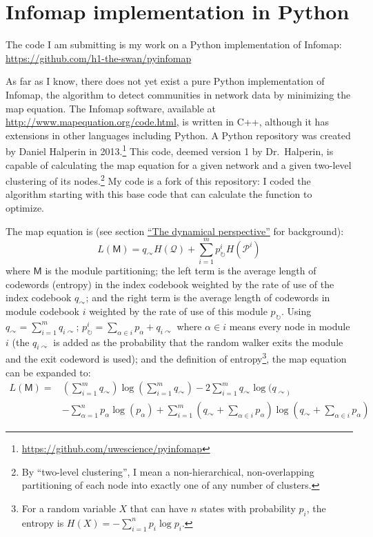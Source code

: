 \hypertarget{pyinfomap}{\section{Infomap implementation in
Python}\label{pyinfomap}}

\protect\hyperlink{pyinfomap}{}

The code I am submitting is my work on a Python implementation of
Infomap: \url{https://github.com/h1-the-swan/pyinfomap}

As far as I know, there does not yet exist a pure Python implementation
of Infomap, the algorithm to detect communities in network data by
minimizing the map equation. The Infomap software, available at
\url{http://www.mapequation.org/code.html}, is written in C++, although
it has extensions in other languages including Python. A Python
repository was created by Daniel Halperin in 2013.\footnote{\url{https://github.com/uwescience/pyinfomap}}
This code, deemed version 1 by Dr.~Halperin, is capable of calculating
the map equation for a given network and a given two-level clustering of
its nodes.\footnote{By ``two-level clustering'', I mean a
  non-hierarchical, non-overlapping partitioning of each node into
  exactly one of any number of clusters.} My code is a fork of this
repository: I coded the algorithm starting with this base code that can
calculate the function to optimize.

The map equation is (see section
\protect\hyperlink{the-dynamical-perspective}{``The dynamical
perspective''} for background):
\[L(\mathsf{M}) = q_{\curvearrowright} H(\mathcal{Q}) + \sum_{i=1}^{m}{p_{\circlearrowright}^{i} H(\mathcal{P}^i)}\]
where \(\mathsf{M}\) is the module partitioning; the left term is the
average length of codewords (entropy) in the index codebook weighted by
the rate of use of the index codebook \(q_{\curvearrowright}\); and the
right term is the average length of codewords in module codebook \(i\)
weighted by the rate of use of this module \(p_{\circlearrowright}\).
Using \(q_{\curvearrowright} = \sum_{i=1}^{m}{q_{i\curvearrowright}}\);
\(p_{\circlearrowright}^{i} = \sum_{\alpha \in i}{p_{\alpha}} + q_{i\curvearrowright}\)
where \(\alpha \in i\) means every node in module \(i\) (the
\(q_{i\curvearrowright}\) is added as the probability that the random
walker exits the module and the exit codeword is used); and the
definition of entropy\footnote{For a random variable \(X\) that can have
  \(n\) states with probability \(p_i\), the entropy is
  \(H(X) = -\sum_{i=1}^{n}{p_i\log{p_i}}\).}, the map equation can be
expanded to: \[
\begin{aligned}
L(\mathsf{M}) = &\left(\sum_{i=1}^{m}{q_{\curvearrowright}}\right) 
                                        \log \left(\sum_{i=1}^{m}{q_{\curvearrowright}}\right)
                                        - 2 \sum_{i=1}^{m}{q_{\curvearrowright}} \log (q_{\curvearrowright)} \\
                                &- \sum_{\alpha=1}^{n}{p_{\alpha} \log(p_\alpha)}
                                        + \sum_{i=1}^{m}{\left(q_{\curvearrowright} + \sum_{\alpha \in i}{p_{\alpha}}\right) \log \left(q_{\curvearrowright} + \sum_{\alpha \in i}{p_{\alpha}}\right)}
\end{aligned}
\]

